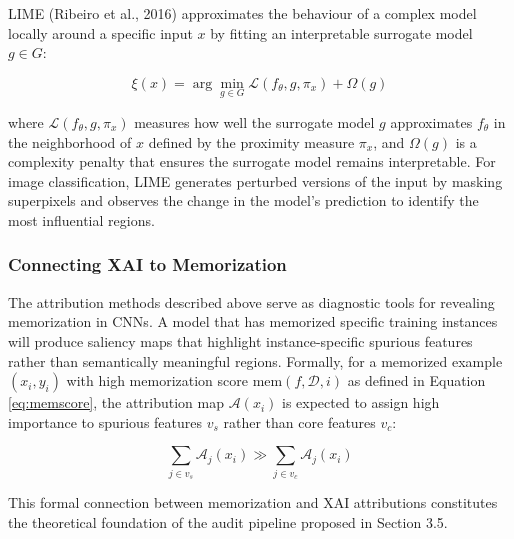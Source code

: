 LIME (Ribeiro et al., 2016) approximates the 
behaviour of a complex model locally around 
a specific input $x$ by fitting an interpretable 
surrogate model $g \in G$:

\begin{equation}
\xi(x) = \arg\min_{g \in G} 
\mathcal{L}(f_\theta, g, \pi_x) + \Omega(g)
\label{eq:lime}
\end{equation}

where $\mathcal{L}(f_\theta, g, \pi_x)$ measures 
how well the surrogate model $g$ approximates 
$f_\theta$ in the neighborhood of $x$ defined 
by the proximity measure $\pi_x$, and $\Omega(g)$ 
is a complexity penalty that ensures the surrogate 
model remains interpretable. For image 
classification, LIME generates perturbed versions 
of the input by masking superpixels and observes 
the change in the model's prediction to identify 
the most influential regions.

\subsubsection{Connecting XAI to Memorization}

The attribution methods described above serve 
as diagnostic tools for revealing memorization 
in CNNs. A model that has memorized specific 
training instances will produce saliency maps 
that highlight instance-specific spurious 
features rather than semantically meaningful 
regions. Formally, for a memorized example 
$(x_i, y_i)$ with high memorization score 
$\text{mem}(f, \mathcal{D}, i)$ as defined 
in Equation \ref{eq:memscore}, the attribution 
map $\mathcal{A}(x_i)$ is expected to assign 
high importance to spurious features $v_s$ 
rather than core features $v_c$:

\begin{equation}
\sum_{j \in v_s} \mathcal{A}_j(x_i) \gg 
\sum_{j \in v_c} \mathcal{A}_j(x_i)
\label{eq:xaimem}
\end{equation}

This formal connection between memorization 
and XAI attributions constitutes the 
theoretical foundation of the audit pipeline 
proposed in Section 3.5.